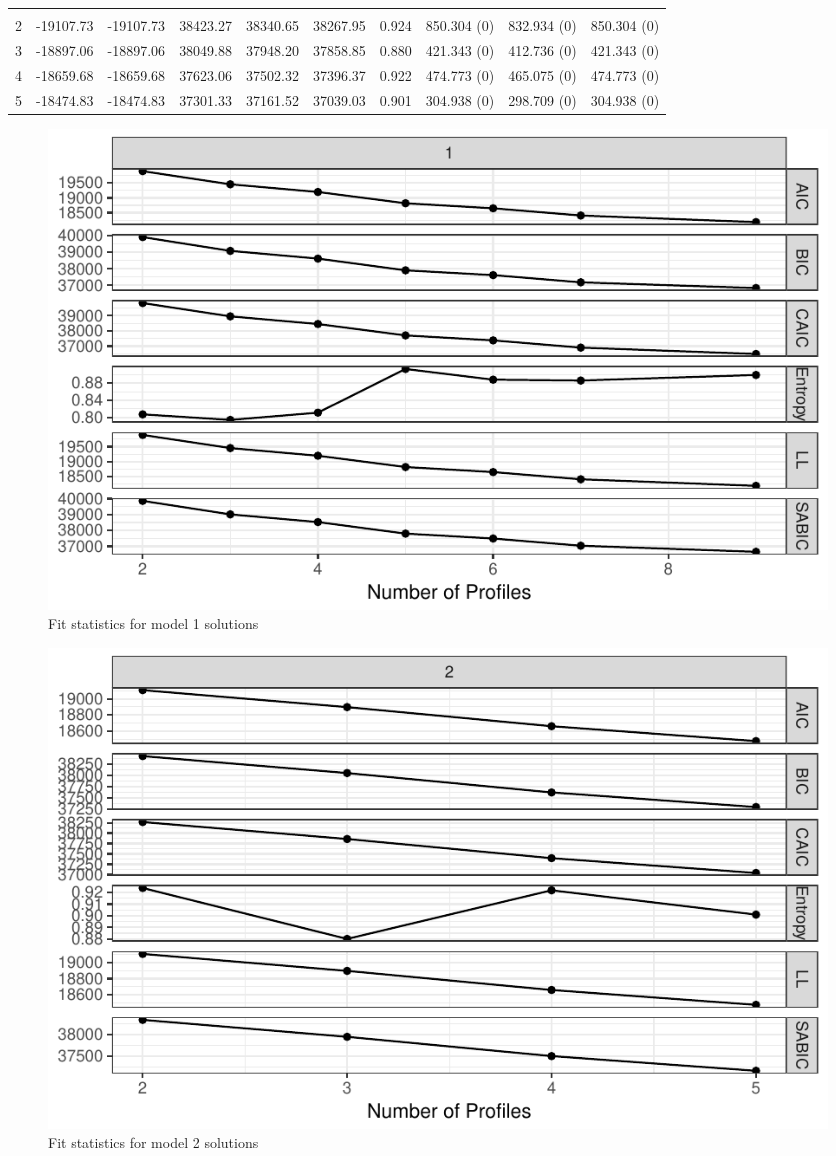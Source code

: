 \documentclass[]{book}
\theoremstyle{definition}
\theoremstyle{definition}
\theoremstyle{definition}
\theoremstyle{remark}
\begin{document}
\begin{landscape}
\begin{table}
{\begin{tabular}[t]{rrrrrrrlll}
\addlinespace[0.3em]
\multicolumn{10}{l}{\textbf{Model 2}}\\
\hspace{1em}2 & -19107.73 & -19107.73 & 38423.27 & 38340.65 & 38267.95 & 0.924 & 850.304 (0) & 832.934 (0) & 850.304 (0)\\
\hspace{1em}3 & -18897.06 & -18897.06 & 38049.88 & 37948.20 & 37858.85 & 0.880 & 421.343 (0) & 412.736 (0) & 421.343 (0)\\
\hspace{1em}4 & -18659.68 & -18659.68 & 37623.06 & 37502.32 & 37396.37 & 0.922 & 474.773 (0) & 465.075 (0) & 474.773 (0)\\
\hspace{1em}5 & -18474.83 & -18474.83 & 37301.33 & 37161.52 & 37039.03 & 0.901 & 304.938 (0) & 298.709 (0) & 304.938 (0)\\
\bottomrule
\end{tabular}}
\end{table}
\end{landscape}

\begin{figure}

{\centering \includegraphics[width=0.5\linewidth]{rosenberg-dissertation_files/figure-latex/model1-1} 

}

\caption{Fit statistics for model 1 solutions}\label{fig:model1}
\end{figure}

\begin{figure}

{\centering \includegraphics[width=0.4\linewidth]{rosenberg-dissertation_files/figure-latex/model2-1} 

}

\caption{Fit statistics for model 2 solutions}\label{fig:model2}
\end{figure}
\end{document}
